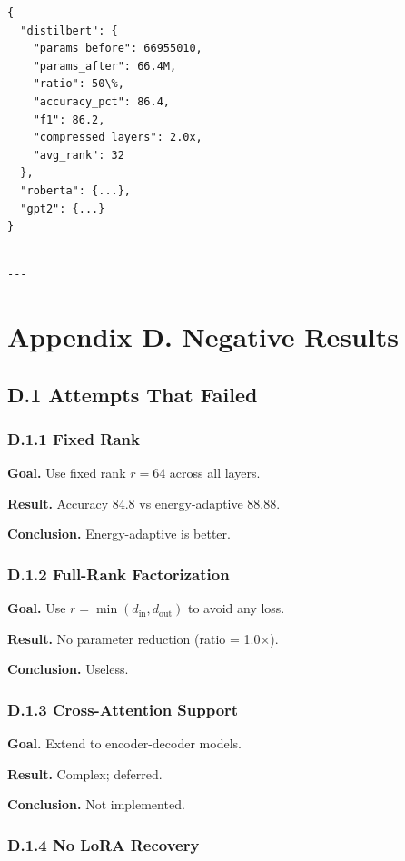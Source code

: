 \begin{lstlisting}
{
  "distilbert": {
    "params_before": 66955010,
    "params_after": 66.4M,
    "ratio": 50\%,
    "accuracy_pct": 86.4,
    "f1": 86.2,
    "compressed_layers": 2.0x,
    "avg_rank": 32
  },
  "roberta": {...},
  "gpt2": {...}
}
\end{lstlisting}
\begin{lstlisting}

---
\end{lstlisting}


\section{Appendix D. Negative Results}

\subsection{D.1 Attempts That Failed}

\subsubsection{D.1.1 Fixed Rank}

\textbf{Goal.} Use fixed rank $r = 64$ across all layers.

\textbf{Result.} Accuracy 84.8 vs energy-adaptive 88.88.

\textbf{Conclusion.} Energy-adaptive is better.

\subsubsection{D.1.2 Full-Rank Factorization}

\textbf{Goal.} Use $r = \min(d_\text{in}, d_\text{out})$ to avoid any loss.

\textbf{Result.} No parameter reduction (ratio = 1.0$\times$).

\textbf{Conclusion.} Useless.

\subsubsection{D.1.3 Cross-Attention Support}

\textbf{Goal.} Extend to encoder-decoder models.

\textbf{Result.} Complex; deferred.

\textbf{Conclusion.} Not implemented.

\subsubsection{D.1.4 No LoRA Recovery}

